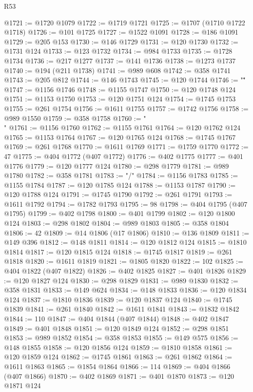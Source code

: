 \begin{lexlean}{R53}
\begin{coremodule}
@1721 := @1720 @1079
@1722 := @1719 @1721
@1725 := @1707 (@1710 @1722 @1718)
@1726 := @101 @1725
@1727 := @1522 @1091
@1728 := @186 @1091
@1729 := @205 @153
@1730 := @146 @1729
@1731 := @120 @1730
@1732 := @1731 @124
@1733 := @123 @1732
@1734 := @984 @1733
@1735 := @1728 @1734
@1736 := @217 @1277
@1737 := @141 @1736
@1738 := @1273 @1737
@1740 := @194 (@211 @1738)
@1741 := @989 @608
@1742 := @358 @1741
@1743 := @205 @812
@1744 := @146 @1743
@1745 := @120 @1744
@1746 := "\""
@1747 := @1156 @1746
@1748 := @1155 @1747
@1750 := @120 @1748 @124
@1751 := @1153 @1750
@1753 := @120 @1751 @124
@1754 := @1745 @1753
@1755 := @261 @1754
@1756 := @1611 @1755
@1757 := @1742 @1756
@1758 := @989 @1550
@1759 := @358 @1758
@1760 := "\\"
@1761 := @1156 @1760
@1762 := @1155 @1761
@1764 := @120 @1762 @124
@1765 := @1153 @1764
@1767 := @120 @1765 @124
@1768 := @1745 @1767
@1769 := @261 @1768
@1770 := @1611 @1769
@1771 := @1759 @1770
@1772 := 47
@1775 := @404 @1772 (@407 @1772)
@1776 := @402 @1775
@1777 := @401 @1776
@1779 := @120 @1777 @124
@1780 := @298 @1779
@1781 := @989 @1780
@1782 := @358 @1781
@1783 := "/"
@1784 := @1156 @1783
@1785 := @1155 @1784
@1787 := @120 @1785 @124
@1788 := @1153 @1787
@1790 := @120 @1788 @124
@1791 := @1745 @1790
@1792 := @261 @1791
@1793 := @1611 @1792
@1794 := @1782 @1793
@1795 := 98
@1798 := @404 @1795 (@407 @1795)
@1799 := @402 @1798
@1800 := @401 @1799
@1802 := @120 @1800 @124
@1803 := @298 @1802
@1804 := @989 @1803
@1805 := @358 @1804
@1806 := 42
@1809 := @14 @1806 (@17 @1806)
@1810 := @136 @1809
@1811 := @149 @396
@1812 := @148 @1811
@1814 := @120 @1812 @124
@1815 := @1810 @1814
@1817 := @120 @1815 @124
@1818 := @1745 @1817
@1819 := @261 @1818
@1820 := @1611 @1819
@1821 := @1805 @1820
@1822 := 102
@1825 := @404 @1822 (@407 @1822)
@1826 := @402 @1825
@1827 := @401 @1826
@1829 := @120 @1827 @124
@1830 := @298 @1829
@1831 := @989 @1830
@1832 := @358 @1831
@1833 := @149 @624
@1834 := @148 @1833
@1836 := @120 @1834 @124
@1837 := @1810 @1836
@1839 := @120 @1837 @124
@1840 := @1745 @1839
@1841 := @261 @1840
@1842 := @1611 @1841
@1843 := @1832 @1842
@1844 := 110
@1847 := @404 @1844 (@407 @1844)
@1848 := @402 @1847
@1849 := @401 @1848
@1851 := @120 @1849 @124
@1852 := @298 @1851
@1853 := @989 @1852
@1854 := @358 @1853
@1855 := @149 @575
@1856 := @148 @1855
@1858 := @120 @1856 @124
@1859 := @1810 @1858
@1861 := @120 @1859 @124
@1862 := @1745 @1861
@1863 := @261 @1862
@1864 := @1611 @1863
@1865 := @1854 @1864
@1866 := 114
@1869 := @404 @1866 (@407 @1866)
@1870 := @402 @1869
@1871 := @401 @1870
@1873 := @120 @1871 @124

\end{coremodule}
\end{lexlean}
